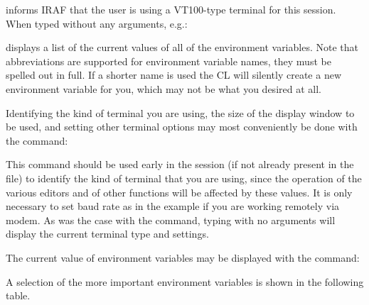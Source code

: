 \noindent
informs IRAF that the user is using a VT100-type terminal for this session. 
When typed without any arguments, e.g.:

\begin{quotation}\noindent
{} 
\end{quotation}

\noindent
{} displays a list of the current values of all of the environment
variables.  Note that abbreviations are  supported for
environment variable names, they must be spelled out in full.
If a shorter name is used the CL will silently create a new environment
variable for you, which may not be what you desired at all. 

Identifying the kind of terminal you are using, the size of the display
window to be used, and setting other terminal options may most conveniently
be done with the  command:

\begin{quotation}\noindent
{} 
\end{quotation}

\noindent
This command should be used early in the session (if not already present in
the  file) to identify the kind of terminal that you are
using, since the operation of the various editors and of other functions will
be affected by these values.  It is only necessary to set baud rate as in
the example if you are working remotely via modem.  As was the case with
the  command, typing  with no arguments will
display the current terminal type and settings.

The current value of  environment variables may be
displayed with the  command:

\begin{quotation}\noindent
{} 
\end{quotation}

\noindent
A selection of the more important environment variables is shown in the
following table.

